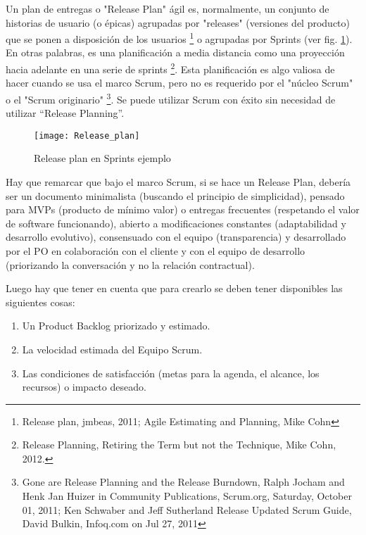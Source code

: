 Un plan de entregas o "Release Plan" ágil es, normalmente, un conjunto de historias de usuario (o épicas) agrupadas por "releases" (versiones del producto) que se ponen a disposición de los usuarios \footnote{Release plan, jmbeas, 2011; Agile Estimating and Planning, Mike Cohn} o agrupadas por Sprints (ver fig. \ref{fig:Release_plan}). En otras palabras, es una planificación a media distancia como una proyección hacia adelante en una serie de sprints \footnote{Release Planning, Retiring the Term but not the Technique, Mike Cohn, 2012.}. Esta planificación es algo valiosa de hacer cuando se usa el marco Scrum, pero no es requerido por el "núcleo Scrum" o el "Scrum originario" \footnote{Gone are Release Planning and the Release Burndown, Ralph Jocham and Henk Jan Huizer in Community Publications, Scrum.org, Saturday, October 01, 2011; Ken Schwaber and Jeff Sutherland Release Updated Scrum Guide, David Bulkin, Infoq.com on Jul 27, 2011}. Se puede utilizar Scrum con éxito sin necesidad de utilizar “Release Planning”.

\begin{figure}[h]
  \centering
  \texttt{[image: Release\_plan]}
  \caption{Release plan en Sprints ejemplo}
  \centering
  \label{fig:Release_plan} %
\end{figure}
\FloatBarrier %

Hay que remarcar que bajo el marco Scrum, si se hace un Release Plan, debería ser un documento minimalista (buscando el principio de simplicidad), pensado para MVPs (producto de mínimo valor) o entregas frecuentes (respetando el valor de software funcionando), abierto a modificaciones constantes (adaptabilidad y desarrollo evolutivo), consensuado con el equipo (transparencia) y desarrollado por el PO en colaboración con el cliente y con el equipo de desarrollo (priorizando la conversación y no la relación contractual).

Luego hay que tener en cuenta que para crearlo se deben tener disponibles las siguientes cosas:

\begin{enumerate}
\item Un Product Backlog priorizado y estimado.
\item La velocidad estimada del Equipo Scrum.
\item Las condiciones de satisfacción (metas para la agenda, el alcance, los recursos) o impacto deseado.
\end{enumerate}

